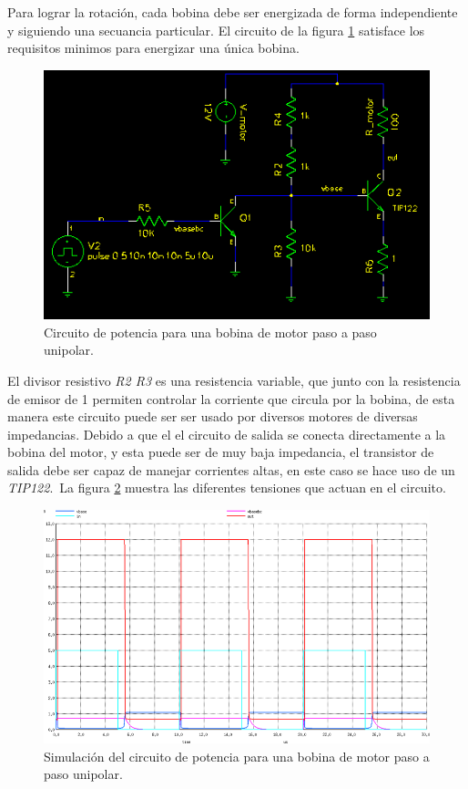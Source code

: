 Para lograr la rotaci\'on, cada bobina debe ser energizada de forma
independiente y siguiendo una secuancia particular. El circuito de la figura
\ref{fig:cir_single_coil} satisface los requisitos minimos para energizar una
\'unica bobina.

\begin{figure}[htp]
\centering
\includegraphics[scale=0.7]{./img/cir_single_coil.png}
\caption{Circuito de potencia para una bobina de motor paso a paso unipolar.}
\label{fig:cir_single_coil}
\end{figure}

El divisor resistivo \emph{R2 R3} es una resistencia variable, que junto con
la resistencia de emisor de 1 \ohm  permiten controlar la corriente que circula
por la bobina, de esta manera este circuito puede ser ser usado por diversos
motores de diversas impedancias. Debido a que el el circuito de salida se
conecta directamente a la bobina del motor, y esta puede ser de muy baja
impedancia, el transistor de salida debe ser capaz de manejar corrientes altas,
en este caso se hace uso de un \emph{TIP122}.\
La figura \ref{fig:cir_single_coil_plot} muestra las diferentes tensiones que
actuan en el circuito. 

\begin{figure}[htp]
\centering
\includegraphics[width=15cm]{./img/cir_single_coil_plot.png}
\caption{Simulaci\'on del circuito de potencia para una bobina de motor paso a
paso unipolar.}
\label{fig:cir_single_coil_plot}
\end{figure}

